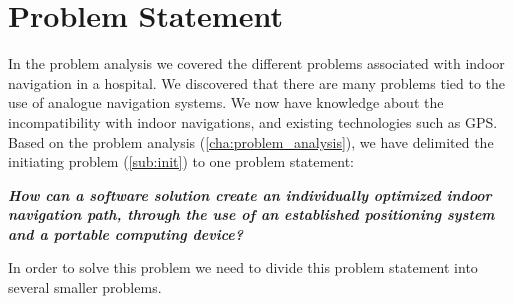 \chapter{Problem Statement}




In the problem analysis we covered the different problems associated with indoor navigation in a hospital.
We discovered that there are many problems tied to the use of analogue navigation systems. We now have knowledge about the incompatibility with indoor navigations, and existing technologies such as GPS.
Based on the problem analysis (\cref{cha:problem_analysis}), we have delimited the initiating problem (\cref{sub:init}) to one problem statement:

\textit{\textbf{How can a software solution create an individually optimized indoor navigation path, through the use of an established positioning system and a portable computing device?}}

In order to solve this problem we need to divide this problem statement into several smaller problems.








